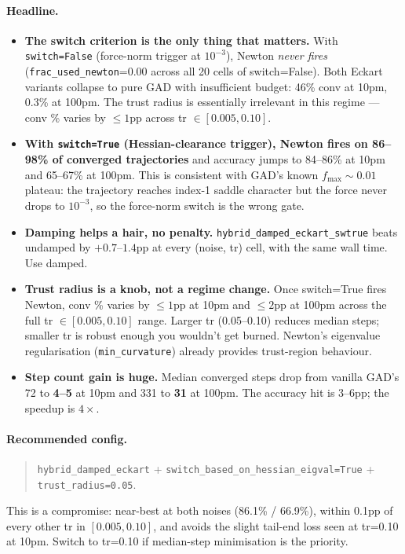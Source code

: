 \documentclass[11pt]{article}
\begin{document}
\paragraph{Headline.}
\begin{itemize}[leftmargin=1.5em]
\item \textbf{The switch criterion is the only thing that matters.}
  With \texttt{switch=False} (force-norm trigger at $10^{-3}$), Newton
  \emph{never fires} (\texttt{frac\_used\_newton}=0.00 across all 20
  cells of switch=False). Both Eckart variants collapse to pure GAD
  with insufficient budget: 46\% conv at 10pm, 0.3\% at 100pm. The
  trust radius is essentially irrelevant in this regime --- conv \%
  varies by $\le 1$pp across tr $\in [0.005, 0.10]$.
\item \textbf{With \texttt{switch=True} (Hessian-clearance trigger),
  Newton fires on 86--98\% of converged trajectories} and accuracy jumps
  to 84--86\% at 10pm and 65--67\% at 100pm. This is consistent with
  GAD's known $f_{\max}\!\sim\!0.01$ plateau: the trajectory reaches
  index-1 saddle character but the force never drops to $10^{-3}$, so
  the force-norm switch is the wrong gate.
\item \textbf{Damping helps a hair, no penalty.}
  \texttt{hybrid\_damped\_eckart\_swtrue} beats undamped by
  $+0.7$--$1.4$pp at every (noise, tr) cell, with the same wall time.
  Use damped.
\item \textbf{Trust radius is a knob, not a regime change.} Once
  switch=True fires Newton, conv \% varies by $\le 1$pp at 10pm and
  $\le 2$pp at 100pm across the full tr $\in [0.005, 0.10]$ range.
  Larger tr (0.05--0.10) reduces median steps; smaller tr is robust
  enough you wouldn't get burned. Newton's eigenvalue regularisation
  (\texttt{min\_curvature}) already provides trust-region behaviour.
\item \textbf{Step count gain is huge.} Median converged steps drop
  from vanilla GAD's 72 to \textbf{4--5} at 10pm and 331 to \textbf{31}
  at 100pm. The accuracy hit is 3--6pp; the speedup is $4\times$.
\end{itemize}

\paragraph{Recommended config.}
\begin{quote}
\texttt{hybrid\_damped\_eckart} + \texttt{switch\_based\_on\_hessian\_eigval=True}
+ \texttt{trust\_radius=0.05}.
\end{quote}
This is a compromise: near-best at both noises (86.1\% / 66.9\%),
within 0.1pp of every other tr in $[0.005, 0.10]$, and avoids the
slight tail-end loss seen at tr=0.10 at 10pm. Switch to tr=0.10 if
median-step minimisation is the priority.
\end{document}
